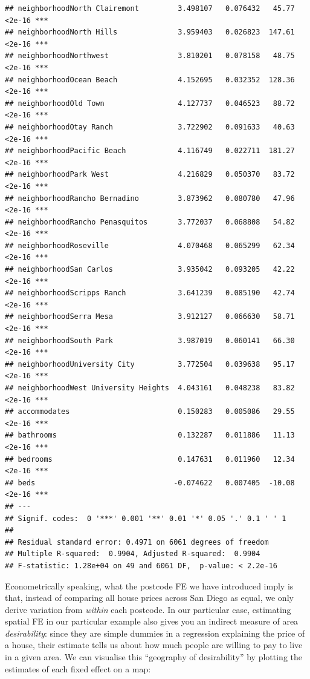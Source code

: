 \documentclass[
]{book}
\begin{document}
\begin{verbatim}
## neighborhoodNorth Clairemont         3.498107   0.076432   45.77   <2e-16 ***
## neighborhoodNorth Hills              3.959403   0.026823  147.61   <2e-16 ***
## neighborhoodNorthwest                3.810201   0.078158   48.75   <2e-16 ***
## neighborhoodOcean Beach              4.152695   0.032352  128.36   <2e-16 ***
## neighborhoodOld Town                 4.127737   0.046523   88.72   <2e-16 ***
## neighborhoodOtay Ranch               3.722902   0.091633   40.63   <2e-16 ***
## neighborhoodPacific Beach            4.116749   0.022711  181.27   <2e-16 ***
## neighborhoodPark West                4.216829   0.050370   83.72   <2e-16 ***
## neighborhoodRancho Bernadino         3.873962   0.080780   47.96   <2e-16 ***
## neighborhoodRancho Penasquitos       3.772037   0.068808   54.82   <2e-16 ***
## neighborhoodRoseville                4.070468   0.065299   62.34   <2e-16 ***
## neighborhoodSan Carlos               3.935042   0.093205   42.22   <2e-16 ***
## neighborhoodScripps Ranch            3.641239   0.085190   42.74   <2e-16 ***
## neighborhoodSerra Mesa               3.912127   0.066630   58.71   <2e-16 ***
## neighborhoodSouth Park               3.987019   0.060141   66.30   <2e-16 ***
## neighborhoodUniversity City          3.772504   0.039638   95.17   <2e-16 ***
## neighborhoodWest University Heights  4.043161   0.048238   83.82   <2e-16 ***
## accommodates                         0.150283   0.005086   29.55   <2e-16 ***
## bathrooms                            0.132287   0.011886   11.13   <2e-16 ***
## bedrooms                             0.147631   0.011960   12.34   <2e-16 ***
## beds                                -0.074622   0.007405  -10.08   <2e-16 ***
## ---
## Signif. codes:  0 '***' 0.001 '**' 0.01 '*' 0.05 '.' 0.1 ' ' 1
## 
## Residual standard error: 0.4971 on 6061 degrees of freedom
## Multiple R-squared:  0.9904, Adjusted R-squared:  0.9904 
## F-statistic: 1.28e+04 on 49 and 6061 DF,  p-value: < 2.2e-16
\end{verbatim}

Econometrically speaking, what the postcode FE we have introduced imply is that, instead of comparing all house prices across San Diego as equal, we only derive variation from \emph{within} each postcode. In our particular case, estimating spatial FE in our particular example also gives you an indirect measure of area \emph{desirability}: since they are simple dummies in a regression explaining the price of a house, their estimate tells us about how much people are willing to pay to live in a given area. We can visualise this ``geography of desirability'' by plotting the estimates of each fixed effect on a map:
\end{document}
